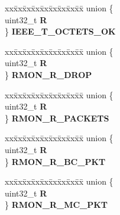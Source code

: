 \begin{DoxyCompactItemize}
\begin{tabbing}
\end{tabbing}\item 
\mbox{\label{structFEC__tag_af54429a423d458f30513b46b2a0b738f}} 
\begin{tabbing}
xx\=xx\=xx\=xx\=xx\=xx\=xx\=xx\=xx\=\kill
union \{\\
\>uint32\_t {\bfseries R}\\
\} {\bfseries IEEE\_T\_OCTETS\_OK}\\

\end{tabbing}\item 
\mbox{\label{structFEC__tag_aea42131be92c7b163167c63b547cb2a7}} 
\begin{tabbing}
xx\=xx\=xx\=xx\=xx\=xx\=xx\=xx\=xx\=\kill
union \{\\
\>uint32\_t {\bfseries R}\\
\} {\bfseries RMON\_R\_DROP}\\

\end{tabbing}\item 
\mbox{\label{structFEC__tag_a2fcac84febcffce830a22be4f6bd592b}} 
\begin{tabbing}
xx\=xx\=xx\=xx\=xx\=xx\=xx\=xx\=xx\=\kill
union \{\\
\>uint32\_t {\bfseries R}\\
\} {\bfseries RMON\_R\_PACKETS}\\

\end{tabbing}\item 
\mbox{\label{structFEC__tag_aa7d74d52600b6a50337f82362b249c4a}} 
\begin{tabbing}
xx\=xx\=xx\=xx\=xx\=xx\=xx\=xx\=xx\=\kill
union \{\\
\>uint32\_t {\bfseries R}\\
\} {\bfseries RMON\_R\_BC\_PKT}\\

\end{tabbing}\item 
\mbox{\label{structFEC__tag_a218c04902533a0155e5ac12779826e03}} 
\begin{tabbing}
xx\=xx\=xx\=xx\=xx\=xx\=xx\=xx\=xx\=\kill
union \{\\
\>uint32\_t {\bfseries R}\\
\} {\bfseries RMON\_R\_MC\_PKT}\\


\end{tabbing}
\end{DoxyCompactItemize}
